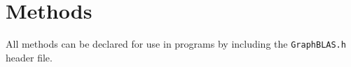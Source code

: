 \documentclass[11pt]{extbook}
\begin{document}
\chapter{Methods}
\label{Sec:Methods}
All methods can be declared for use in programs by including the {\tt GraphBLAS.h} header file.


















\appendix


%
%
\end{document}
